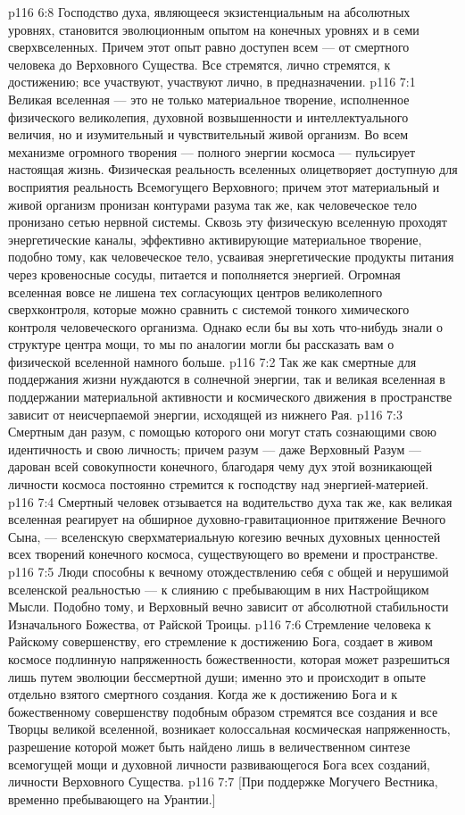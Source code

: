\vs p116 6:8 Господство духа, являющееся экзистенциальным на абсолютных уровнях, становится эволюционным опытом на конечных уровнях и в семи сверхвселенных. Причем этот опыт равно доступен всем --- от смертного человека до Верховного Существа. Все стремятся, лично стремятся, к достижению; все участвуют, участвуют лично, в предназначении.
\vs p116 7:1 Великая вселенная --- это не только материальное творение, исполненное физического великолепия, духовной возвышенности и интеллектуального величия, но и изумительный и чувствительный живой организм. Во всем механизме огромного творения --- полного энергии космоса --- пульсирует настоящая жизнь. Физическая реальность вселенных олицетворяет доступную для восприятия реальность Всемогущего Верховного; причем этот материальный и живой организм пронизан контурами разума так же, как человеческое тело пронизано сетью нервной системы. Сквозь эту физическую вселенную проходят энергетические каналы, эффективно активирующие материальное творение, подобно тому, как человеческое тело, усваивая энергетические продукты питания через кровеносные сосуды, питается и пополняется энергией. Огромная вселенная вовсе не лишена тех согласующих центров великолепного сверхконтроля, которые можно сравнить с системой тонкого химического контроля человеческого организма. Однако если бы вы хоть что\hyp{}нибудь знали о структуре центра мощи, то мы по аналогии могли бы рассказать вам о физической вселенной намного больше.
\vs p116 7:2 Так же как смертные для поддержания жизни нуждаются в солнечной энергии, так и великая вселенная в поддержании материальной активности и космического движения в пространстве зависит от неисчерпаемой энергии, исходящей из нижнего Рая.
\vs p116 7:3 Смертным дан разум, с помощью которого они могут стать сознающими свою идентичность и свою личность; причем разум --- даже Верховный Разум --- дарован всей совокупности конечного, благодаря чему дух этой возникающей личности космоса постоянно стремится к господству над энергией\hyp{}материей.
\vs p116 7:4 Смертный человек отзывается на водительство духа так же, как великая вселенная реагирует на обширное духовно\hyp{}гравитационное притяжение Вечного Сына, --- вселенскую сверхматериальную когезию вечных духовных ценностей всех творений конечного космоса, существующего во времени и пространстве.
\vs p116 7:5 Люди способны к вечному отождествлению себя с общей и нерушимой вселенской реальностью --- к слиянию с пребывающим в них Настройщиком Мысли. Подобно тому, и Верховный вечно зависит от абсолютной стабильности Изначального Божества, от Райской Троицы.
\vs p116 7:6 Стремление человека к Райскому совершенству, его стремление к достижению Бога, создает в живом космосе подлинную напряженность божественности, которая может разрешиться лишь путем эволюции бессмертной души; именно это и происходит в опыте отдельно взятого смертного создания. Когда же к достижению Бога и к божественному совершенству подобным образом стремятся все создания и все Творцы великой вселенной, возникает колоссальная космическая напряженность, разрешение которой может быть найдено лишь в величественном синтезе всемогущей мощи и духовной личности развивающегося Бога всех созданий, личности Верховного Существа.
\vsetoff
\vs p116 7:7 [При поддержке Могучего Вестника, временно пребывающего на Урантии.]
